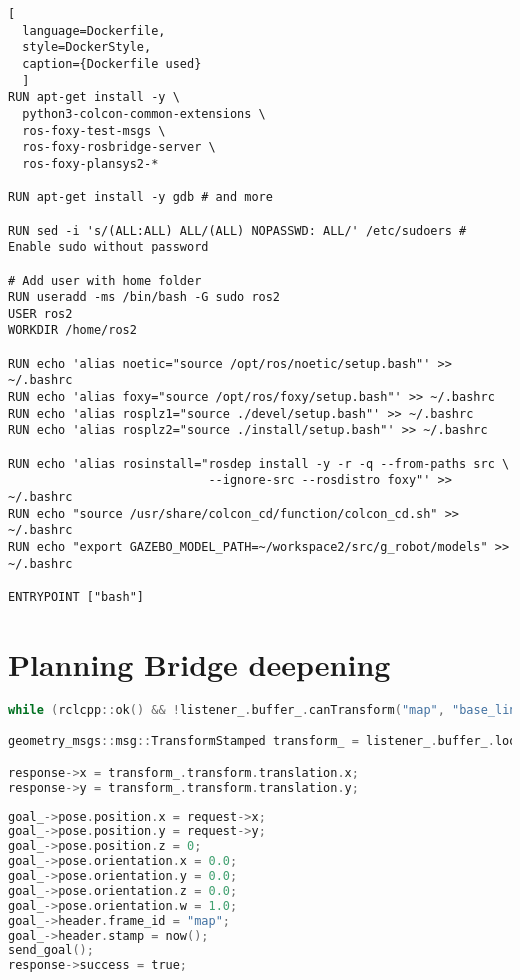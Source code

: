 \begin{lstlisting}[
  language=Dockerfile,
  style=DockerStyle,
  caption={Dockerfile used}
  ]
RUN apt-get install -y \
  python3-colcon-common-extensions \
  ros-foxy-test-msgs \
  ros-foxy-rosbridge-server \
  ros-foxy-plansys2-*

RUN apt-get install -y gdb # and more

RUN sed -i 's/(ALL:ALL) ALL/(ALL) NOPASSWD: ALL/' /etc/sudoers # Enable sudo without password

# Add user with home folder
RUN useradd -ms /bin/bash -G sudo ros2
USER ros2
WORKDIR /home/ros2

RUN echo 'alias noetic="source /opt/ros/noetic/setup.bash"' >> ~/.bashrc
RUN echo 'alias foxy="source /opt/ros/foxy/setup.bash"' >> ~/.bashrc
RUN echo 'alias rosplz1="source ./devel/setup.bash"' >> ~/.bashrc
RUN echo 'alias rosplz2="source ./install/setup.bash"' >> ~/.bashrc

RUN echo 'alias rosinstall="rosdep install -y -r -q --from-paths src \
                            --ignore-src --rosdistro foxy"' >> ~/.bashrc
RUN echo "source /usr/share/colcon_cd/function/colcon_cd.sh" >> ~/.bashrc
RUN echo "export GAZEBO_MODEL_PATH=~/workspace2/src/g_robot/models" >> ~/.bashrc

ENTRYPOINT ["bash"]
\end{lstlisting}

\chapter{Planning Bridge deepening}
\label{cha:deepening}

\newsavebox\poseserver

\noindent\begin{lrbox}{\poseserver}
  \noindent\begin{lstlisting}[language=C, style=CStyleTextWidth]
while (rclcpp::ok() && !listener_.buffer_.canTransform("map", "base_link", tf2::TimePoint())) rate.sleep();

geometry_msgs::msg::TransformStamped transform_ = listener_.buffer_.lookupTransform("map", "base_link", tf2::TimePoint());

response->x = transform_.transform.translation.x;
response->y = transform_.transform.translation.y;
  \end{lstlisting}
\end{lrbox}

\newsavebox\navigationclient

\noindent\begin{lrbox}{\navigationclient}
  \noindent\begin{lstlisting}[language=C, style=CStyleNoFrame]
goal_->pose.position.x = request->x;
goal_->pose.position.y = request->y;
goal_->pose.position.z = 0;
goal_->pose.orientation.x = 0.0;
goal_->pose.orientation.y = 0.0;
goal_->pose.orientation.z = 0.0;
goal_->pose.orientation.w = 1.0;
goal_->header.frame_id = "map";
goal_->header.stamp = now();
send_goal();
response->success = true;
  \end{lstlisting}
\end{lrbox}

